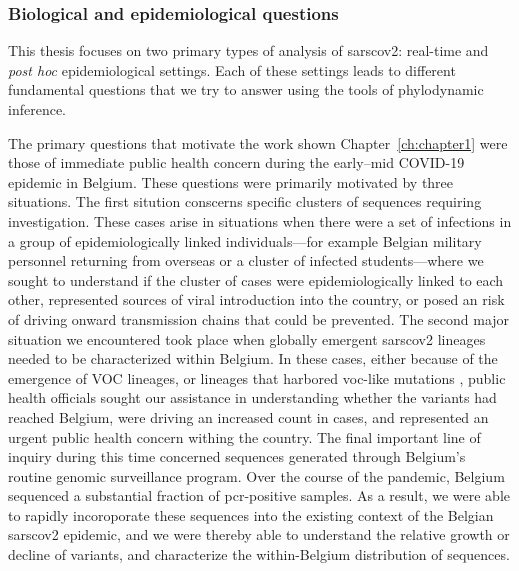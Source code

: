 \subsubsection{Biological and epidemiological questions}
This thesis focuses on two primary types of analysis of \gls{sarscov2}: real-time and \textit{post hoc} epidemiological settings.
Each of these settings leads to different fundamental questions that we try to answer using the tools of phylodynamic inference.

The primary questions that motivate the work shown Chapter~\ref{ch:chapter1} were those of immediate public health concern during the early--mid COVID-19 epidemic in Belgium.
These questions were primarily motivated by three situations. 
The first sitution conscerns specific clusters of sequences requiring investigation.
These cases arise in situations when there were a set of infections in a group of epidemiologically linked individuals---for example Belgian military personnel returning from overseas \citep{pirnay2020study} or a cluster of infected students\citep{vanelslande2022two}---where we sought to understand if the cluster of cases were epidemiologically linked to each other, represented sources of viral introduction into the country, or posed an risk of driving onward transmission chains that could be prevented.
The second major situation we encountered took place when globally emergent \gls{sarscov2} lineages needed to be characterized within Belgium.
In these cases, either because of the emergence of \gls{VOC} lineages, or lineages that harbored \gls{voc}-like mutations \cite{dudas2021emergence}, public health officials sought our assistance in understanding whether the variants had reached Belgium, were driving an increased count in cases, and represented an urgent public health concern withing the country.
The final important line of inquiry during this time concerned sequences generated through Belgium's routine genomic surveillance program.
Over the course of the pandemic, Belgium sequenced a substantial fraction of \gls{pcr}-positive samples.
As a result, we were able to rapidly incoroporate these sequences into the existing context of the Belgian \gls{sarscov2} epidemic, and we were thereby able to understand the relative growth or decline of variants, and characterize the within-Belgium distribution of sequences.

